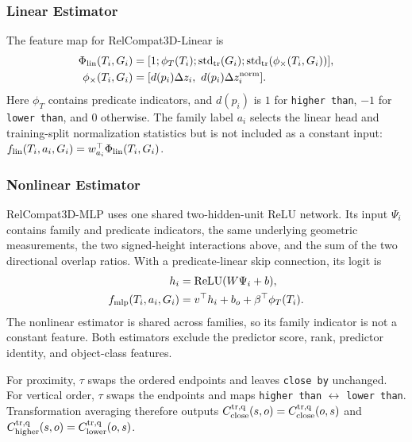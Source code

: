 \documentclass[letterpaper]{article}
\begin{document}
\subsubsection{Linear Estimator}
The feature map for RelCompat3D-Linear is
\begin{equation}
\begin{aligned}
\Phi_{\rm lin}(T_i,G_i)&=[1;\phi_T(T_i);\operatorname{std}_{\rm tr}(G_i);
\operatorname{std}_{\rm tr}(\phi_{\times}(T_i,G_i))],\\
\phi_{\times}(T_i,G_i)&=
[d(p_i)\Delta z_i,\ d(p_i)\Delta z_i^{\rm norm}].
\end{aligned}
\end{equation}
Here $\phi_T$ contains predicate indicators, and $d(p_i)$ is $1$ for \texttt{higher than}, $-1$ for \texttt{lower than}, and $0$ otherwise. The family label $a_i$ selects the linear head and training-split normalization statistics but is not included as a constant input: $f_{\rm lin}(T_i,a_i,G_i)=w_{a_i}^\top\Phi_{\rm lin}(T_i,G_i)$.

\subsubsection{Nonlinear Estimator}
RelCompat3D-MLP uses one shared two-hidden-unit ReLU network. Its input $\Psi_i$ contains family and predicate indicators, the same underlying geometric measurements, the two signed-height interactions above, and the sum of the two directional overlap ratios. With a predicate-linear skip connection, its logit is
\begin{equation}
\begin{aligned}
h_i&=\operatorname{ReLU}(W\Psi_i+b),\\
f_{\rm mlp}(T_i,a_i,G_i)&=v^\top h_i+b_o+
\beta^\top\phi_T(T_i).
\end{aligned}
\end{equation}
The nonlinear estimator is shared across families, so its family indicator is not a constant feature. Both estimators exclude the predictor score, rank, predictor identity, and object-class features.

For proximity, $\tau$ swaps the ordered endpoints and leaves \texttt{close by} unchanged. For vertical order, $\tau$ swaps the endpoints and maps \texttt{higher than} $\leftrightarrow$ \texttt{lower than}. Transformation averaging therefore outputs
$C^{\rm tr,q}_{\rm close}(s,o)=C^{\rm tr,q}_{\rm close}(o,s)$ and
$C^{\rm tr,q}_{\rm higher}(s,o)=C^{\rm tr,q}_{\rm lower}(o,s)$.
\end{document}
